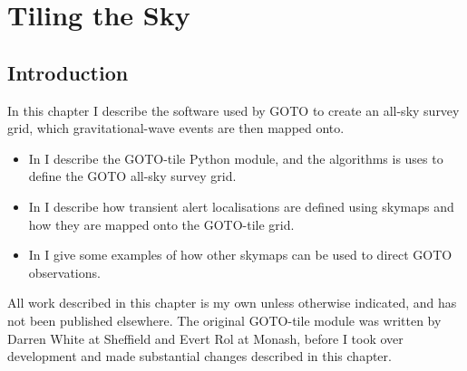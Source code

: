 \chapter{Tiling the Sky}
\label{chap:tiling}
\chaptoc{}


\newpage
\section{Introduction}
\label{sec:tiling_intro}
\begin{colsection}

In this chapter I describe the software used by GOTO to create an all-sky survey grid, which gravitational-wave events are then mapped onto.
%
\begin{itemize}
    \item In  I describe the GOTO-tile Python module, and the algorithms is uses to define the GOTO all-sky survey grid.
    \item In  I describe how transient alert localisations are defined using skymaps and how they are mapped onto the GOTO-tile grid.
    \item In  I give some examples of how other skymaps can be used to direct GOTO observations.
\end{itemize}
%
All work described in this chapter is my own unless otherwise indicated, and has not been published elsewhere. The original GOTO-tile module was written by Darren White at Sheffield and Evert Rol at Monash, before I took over development and made substantial changes described in this chapter.

\end{colsection}


\newpage
